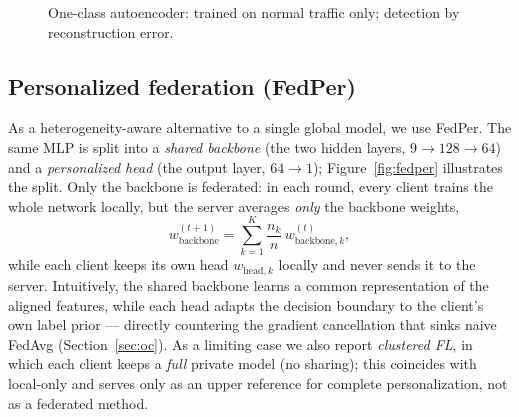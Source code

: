 \documentclass[11pt,a4paper]{article}
\begin{document}
\begin{figure}[htbp]
\centering
{}
\caption{One-class autoencoder: trained on normal traffic only; detection by
reconstruction error.}
\label{fig:ae}
\end{figure}

\subsection{Personalized federation (FedPer)}
\label{sec:fedper}
As a heterogeneity-aware alternative to a single global model, we use FedPer. The
same MLP is split into a \emph{shared backbone} (the two hidden layers,
\(9\!\to\!128\!\to\!64\)) and a \emph{personalized head} (the output layer,
\(64\!\to\!1\)); Figure~\ref{fig:fedper} illustrates the split. Only the backbone
is federated: in each round, every client trains the whole network locally, but
the server averages \emph{only} the backbone weights,
\begin{equation}
w_{\mathrm{backbone}}^{(t+1)} = \sum_{k=1}^{K}\frac{n_k}{n}\,
w_{\mathrm{backbone},k}^{(t)},
\label{eq:fedper}
\end{equation}
while each client keeps its own head \(w_{\mathrm{head},k}\) locally and never
sends it to the server. Intuitively, the shared backbone learns a common
representation of the aligned features, while each head adapts the decision
boundary to the client's own label prior --- directly countering the gradient
cancellation that sinks naive FedAvg (Section~\ref{sec:oc}). As a limiting case we
also report \emph{clustered FL}, in which each client keeps a \emph{full} private
model (no sharing); this coincides with local-only and serves only as an upper
reference for complete personalization, not as a federated method.
\end{document}

